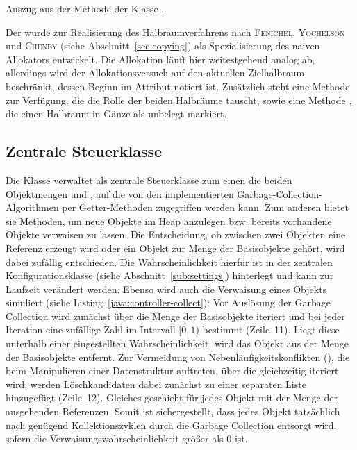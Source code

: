 \begin{listing}[h]
	\inputminted[]{java}{code/NaiveAlloc-allocate.java}
	\caption[Methode  der Klasse ]{Auszug aus der Methode  der Klasse .}
	\label{java:naive-alloc}
\end{listing}

Der  wurde zur Realisierung des Halbraumverfahrens nach \textsc{Fenichel}, \textsc{Yochelson} und \textsc{Cheney} (siehe Abschnitt~\ref{sec:copying}) als Spezialisierung des naiven Allokators entwickelt.
Die Allokation läuft hier weitestgehend analog ab, allerdings wird der Allokationsversuch auf den aktuellen Zielhalbraum beschränkt, dessen Beginn im Attribut  notiert ist.
Zusätzlich steht eine Methode  zur Verfügung, die die Rolle der beiden Halbräume tauscht, sowie eine Methode , die einen Halbraum in Gänze als unbelegt markiert.

\subsection{Zentrale Steuerklasse}
\label{sub:controller}
Die Klasse  verwaltet als zentrale Steuerklasse zum einen die beiden Objektmengen  und , auf die von den implementierten Garbage-Collection-Algorithmen per Getter-Methoden zugegriffen werden kann.
Zum anderen bietet sie Methoden, um neue Objekte im Heap anzulegen bzw. bereits vorhandene Objekte verwaisen zu lassen.
Die Entscheidung, ob zwischen zwei Objekten eine Referenz erzeugt wird oder ein Objekt zur Menge der Basisobjekte gehört, wird dabei zufällig entschieden.
Die Wahrscheinlichkeit hierfür ist in der zentralen Konfigurationsklasse  (siehe Abschnitt~\ref{sub:settings}) hinterlegt und kann zur Laufzeit verändert werden.
Ebenso wird auch die Verwaisung eines Objekts simuliert (siehe Listing~\ref{java:controller-collect}):
Vor Auslösung der Garbage Collection wird zunächst über die Menge der Basisobjekte iteriert und bei jeder Iteration eine zufällige Zahl im Intervall $[0,1)$ bestimmt (Zeile~11).
Liegt diese unterhalb einer eingestellten Wahrscheinlichkeit, wird das Objekt aus der Menge der Basisobjekte entfernt.
Zur Vermeidung von Nebenläufigkeitskonflikten (), die beim Manipulieren einer Datenstruktur auftreten, über die gleichzeitig iteriert wird, werden Löschkandidaten dabei zunächst zu einer separaten Liste hinzugefügt (Zeile~12).
Gleiches geschieht für jedes Objekt mit der Menge  der ausgehenden Referenzen.
Somit ist sichergestellt, dass jedes Objekt tatsächlich nach genügend Kollektionszyklen durch die Garbage Collection entsorgt wird, sofern die Verwaisungswahrscheinlichkeit größer als $0$ ist.

